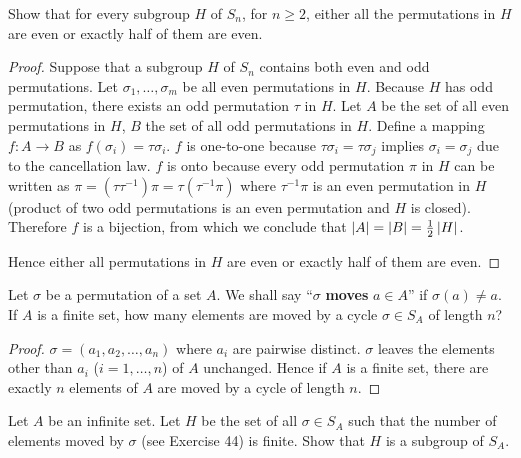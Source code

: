 \newpage
\begin{exercise}
    Show that for every subgroup $H$ of $S_{n}$, for $n\geq 2$, either all the permutations in $H$ are even or exactly half of them are even.
\end{exercise}

\begin{proof}
    Suppose that a subgroup $H$ of $S_{n}$ contains both even and odd permutations. Let $\sigma_{1}, \ldots, \sigma_{m}$ be all even permutations in $H$. Because $H$ has odd permutation, there exists an odd permutation $\tau$ in $H$. Let $A$ be the set of all even permutations in $H$, $B$ the set of all odd permutations in $H$. Define a mapping $f: A\to B$ as $f(\sigma_{i}) = \tau\sigma_{i}$. $f$ is one-to-one because $\tau\sigma_{i} = \tau\sigma_{j}$ implies $\sigma_{i} = \sigma_{j}$ due to the cancellation law. $f$ is onto because every odd permutation $\pi$ in $H$ can be written as $\pi = (\tau\tau^{-1})\pi = \tau(\tau^{-1}\pi)$ where $\tau^{-1}\pi$ is an even permutation in $H$ (product of two odd permutations is an even permutation and $H$ is closed). Therefore $f$ is a bijection, from which we conclude that $\left\vert{A}\right\vert = \left\vert{B}\right\vert = \frac{1}{2}\left\vert{H}\right\vert$.

    Hence either all permutations in $H$ are even or exactly half of them are even.
\end{proof}

\newpage
\begin{exercise}
    Let $\sigma$ be a permutation of a set $A$. We shall say ``$\sigma$ \textbf{moves} $a\in A$'' if $\sigma(a)\ne a$. If $A$ is a finite set, how many elements are moved by a cycle $\sigma\in S_{A}$ of length $n$?
\end{exercise}

\begin{proof}
    $\sigma = (a_{1}, a_{2}, \ldots, a_{n})$ where $a_{i}$ are pairwise distinct. $\sigma$ leaves the elements other than $a_{i}$ ($i = 1,\ldots, n$) of $A$ unchanged. Hence if $A$ is a finite set, there are exactly $n$ elements of $A$ are moved by a cycle of length $n$.
\end{proof}

\newpage
\begin{exercise}
    Let $A$ be an infinite set. Let $H$ be the set of all $\sigma\in S_{A}$ such that the number of elements moved by $\sigma$ (see Exercise 44) is finite. Show that $H$ is a subgroup of $S_{A}$.
\end{exercise}

